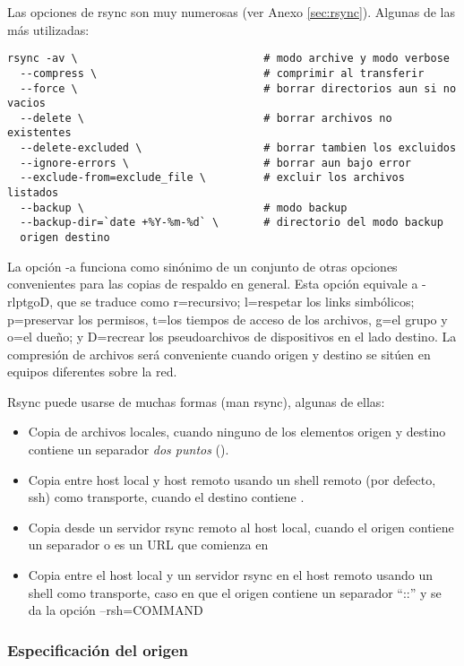 Las opciones de rsync son muy numerosas (ver Anexo \ref{sec:rsync}). Algunas de las más utilizadas:


\begin{lstlisting}
rsync -av \                             # modo archive y modo verbose
  --compress \                          # comprimir al transferir
  --force \                             # borrar directorios aun si no vacios
  --delete \                            # borrar archivos no existentes
  --delete-excluded \                   # borrar tambien los excluidos
  --ignore-errors \                     # borrar aun bajo error
  --exclude-from=exclude_file \         # excluir los archivos listados
  --backup \                            # modo backup
  --backup-dir=`date +%Y-%m-%d` \       # directorio del modo backup
  origen destino
\end{lstlisting}

La opción -a funciona como sinónimo de un conjunto de otras opciones convenientes para las copias de respaldo en general. Esta opción equivale a -rlptgoD, que se traduce como r=recursivo; l=respetar los links simbólicos; p=preservar los permisos, t=los tiempos de acceso de los archivos, g=el grupo y o=el dueño; y D=recrear los pseudoarchivos de dispositivos en el lado destino. La compresión de archivos será conveniente cuando origen y destino se sitúen en equipos diferentes sobre la red.


Rsync puede usarse de muchas formas (man rsync), algunas de ellas:
\begin{itemize}
	\item Copia de archivos locales, cuando ninguno de los elementos origen y destino contiene un separador \emph{dos puntos} (\quotes{:}).
	\item Copia entre host local y host remoto usando un shell remoto (por defecto, ssh) como transporte, cuando el destino contiene \quotes{:}.
	\item Copia desde un servidor rsync remoto al host local, cuando el origen contiene un separador \quotes{::} o es un URL que comienza en 
	\item Copia entre el host local y un servidor rsync en el host remoto usando un shell como transporte, caso en que el origen contiene un separador “::” y se da la opción –rsh=COMMAND
\end{itemize}


\subsubsection{Especificación del origen}

